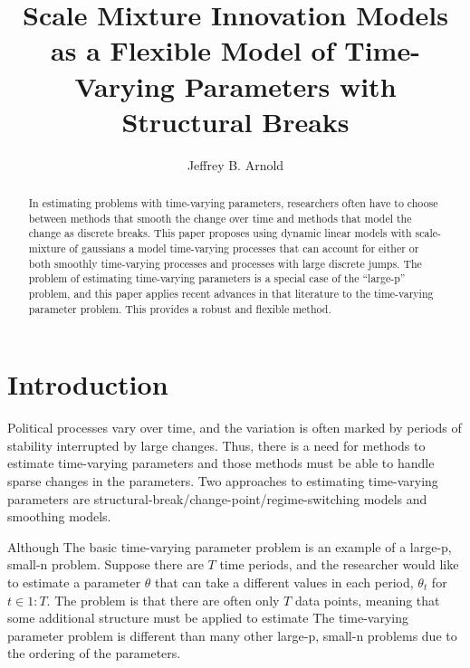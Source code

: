 \documentclass{article}
\author{Jeffrey B. Arnold}
\title{Scale Mixture Innovation Models as a Flexible Model of Time-Varying Parameters with Structural Breaks}
\begin{document}
\maketitle{}

\begin{abstract}
  In estimating problems with time-varying parameters, researchers often have to choose between methods that smooth the change over time and methods that model the change as discrete breaks.
  This paper proposes using dynamic linear models with scale-mixture of gaussians a model time-varying processes that can account for either or both smoothly time-varying processes and processes with large discrete jumps.
  The problem of estimating time-varying parameters is a special case of the ``large-p'' problem, and this paper applies recent advances in that literature to the time-varying parameter problem.
  This provides a robust and flexible method. 
\end{abstract}

\section{Introduction}
\label{sec:introduction}

Political processes vary over time, and the variation is often marked by periods of stability interrupted by large changes.
Thus, there is a need for methods to estimate time-varying parameters and those methods must be able to handle sparse changes in the parameters.
Two approaches to estimating time-varying parameters are structural-break/change-point/regime-switching models and smoothing models.

Although The basic time-varying parameter problem is an example of a large-p, small-n problem.
Suppose there are $T$ time periods, and the researcher would like to estimate a parameter $\theta$ that can take a different values in each period, $\theta_{t}$ for $t \in 1:T$.
The problem is that there are often only $T$ data points, meaning that some additional structure must be applied to estimate 
The time-varying parameter problem is different than many other large-p, small-n problems due to the ordering of the parameters.


\end{document}
